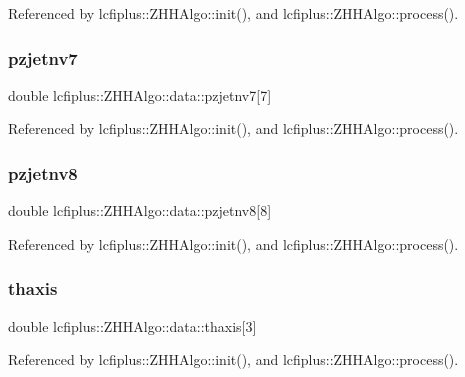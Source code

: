 Referenced by lcfiplus\+::\+Z\+H\+H\+Algo\+::init(), and lcfiplus\+::\+Z\+H\+H\+Algo\+::process().

\mbox{\label{structlcfiplus_1_1ZHHAlgo_1_1data_a9a7df8c98e30acc68763a94f4436ec2a}} 
\subsubsection{pzjetnv7}
{\footnotesize\ttfamily double lcfiplus\+::\+Z\+H\+H\+Algo\+::data\+::pzjetnv7[7]}



Referenced by lcfiplus\+::\+Z\+H\+H\+Algo\+::init(), and lcfiplus\+::\+Z\+H\+H\+Algo\+::process().

\mbox{\label{structlcfiplus_1_1ZHHAlgo_1_1data_ac22fd2bd32dd8c2bf20f22d330830b4d}} 
\subsubsection{pzjetnv8}
{\footnotesize\ttfamily double lcfiplus\+::\+Z\+H\+H\+Algo\+::data\+::pzjetnv8[8]}



Referenced by lcfiplus\+::\+Z\+H\+H\+Algo\+::init(), and lcfiplus\+::\+Z\+H\+H\+Algo\+::process().

\mbox{\label{structlcfiplus_1_1ZHHAlgo_1_1data_a34d266cfeae68d55e04ca6b4bedf22e3}} 
\subsubsection{thaxis}
{\footnotesize\ttfamily double lcfiplus\+::\+Z\+H\+H\+Algo\+::data\+::thaxis[3]}



Referenced by lcfiplus\+::\+Z\+H\+H\+Algo\+::init(), and lcfiplus\+::\+Z\+H\+H\+Algo\+::process().

\mbox{\label{structlcfiplus_1_1ZHHAlgo_1_1data_a6d710cf98db8399dc467302df6d3fedd}} 
